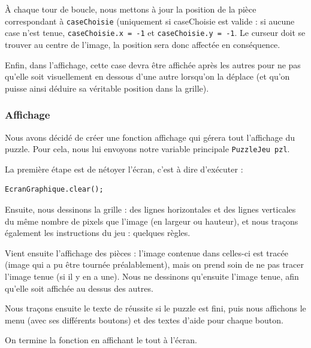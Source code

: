 \documentclass[]{article}
\newcommand{\variable}[1]{\noindent \texttt{#1}}
\begin{document}
À chaque tour de boucle, nous mettons à jour la position de la pièce correspondant à \variable{caseChoisie} (uniquement si caseChoisie est valide : si aucune case n'est tenue, \variable{caseChoisie.x = -1} et \variable{caseChoisie.y = -1}. Le curseur doit se trouver au centre de l'image, la position sera donc affectée en conséquence.

Enfin, dans l'affichage, cette case devra être affichée après les autres pour ne pas qu'elle soit visuellement en dessous d'une autre lorsqu'on la déplace (et qu'on puisse ainsi déduire sa véritable position dans la grille).

\subsubsection{Affichage}

Nous avons décidé de créer une fonction affichage qui gérera tout l'affichage du puzzle. Pour cela, nous lui envoyons notre variable principale \variable{PuzzleJeu pzl}.

La première étape est de nétoyer l'écran, c'est à dire d'exécuter : 
\begin{lstlisting}
EcranGraphique.clear();
\end{lstlisting}

Ensuite, nous dessinons la grille : des lignes horizontales et des lignes verticales du même nombre de pixels que l'image (en largeur ou hauteur), et nous traçons également les instructions du jeu : quelques règles.

Vient ensuite l'affichage des pièces : l'image contenue dans celles-ci est tracée (image qui a pu être tournée préalablement), mais on prend soin de ne pas tracer l'image tenue (si il y en a une). Nous ne dessinons qu'ensuite l'image tenue, afin qu'elle soit affichée au dessus des autres.

Nous traçons ensuite le texte de réussite si le puzzle est fini, puis nous affichons le menu (avec ses différents boutons) et des textes d'aide pour chaque bouton.

On termine la fonction en affichant le tout à l'écran. 


\newpage
\end{document}
